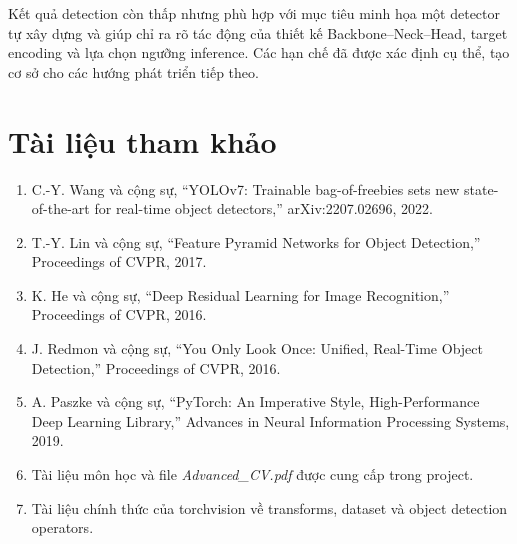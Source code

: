 \documentclass[12pt,a4paper]{article}
\begin{document}
Kết quả detection còn thấp nhưng phù hợp với mục tiêu minh họa một detector tự xây dựng và giúp chỉ ra rõ tác động của thiết kế Backbone--Neck--Head, target encoding và lựa chọn ngưỡng inference. Các hạn chế đã được xác định cụ thể, tạo cơ sở cho các hướng phát triển tiếp theo.

\section{Tài liệu tham khảo}
\begin{enumerate}[leftmargin=*]
  \item C.-Y. Wang và cộng sự, ``YOLOv7: Trainable bag-of-freebies sets new state-of-the-art for real-time object detectors,'' arXiv:2207.02696, 2022.
  \item T.-Y. Lin và cộng sự, ``Feature Pyramid Networks for Object Detection,'' Proceedings of CVPR, 2017.
  \item K. He và cộng sự, ``Deep Residual Learning for Image Recognition,'' Proceedings of CVPR, 2016.
  \item J. Redmon và cộng sự, ``You Only Look Once: Unified, Real-Time Object Detection,'' Proceedings of CVPR, 2016.
  \item A. Paszke và cộng sự, ``PyTorch: An Imperative Style, High-Performance Deep Learning Library,'' Advances in Neural Information Processing Systems, 2019.
  \item Tài liệu môn học và file \textit{Advanced\_CV.pdf} được cung cấp trong project.
  \item Tài liệu chính thức của torchvision về transforms, dataset và object detection operators.
\end{enumerate}
\end{document}
